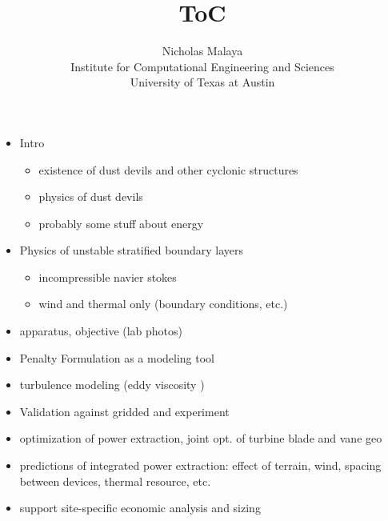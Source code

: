 \documentclass{article}
\title{\bf{ToC}}
\author{Nicholas Malaya \\ Institute for Computational Engineering and Sciences \\ University of Texas at Austin} \date{}
\begin{document}
\maketitle

\newpage

\begin{itemize}
  \item Intro
\begin{itemize}
	\item existence of dust devils and other cyclonic structures
        \item physics of dust devils
	\item probably some stuff about energy
\end{itemize}

  \item Physics of unstable stratified boundary layers
\begin{itemize}
	\item incompressible navier stokes
        \item wind and thermal only (boundary conditions, etc.)
\end{itemize}
  \item apparatus, objective (lab photos)
  \item Penalty Formulation as a modeling tool
  \item turbulence modeling (eddy viscosity )
  \item Validation against gridded and experiment
  \item optimization of power extraction, joint opt. of turbine blade and vane geo
  \item predictions of integrated power extraction: effect of terrain, wind, spacing between devices, thermal resource, etc.
  \item support site-specific economic analysis and sizing
\end{itemize}
\end{document}
